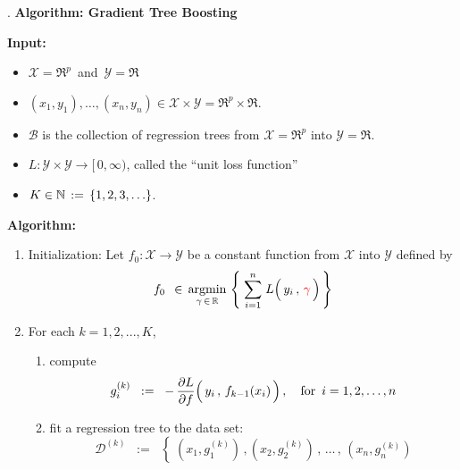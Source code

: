 \begin{center}
\begin{minipage}{6in}
\begin{tcolorbox}[width=0.95\linewidth,colback=white,colframe=gray]
	\begin{center}
	{\color{white}.}\vskip 0.1cm
	\textbf{\large Algorithm: Gradient Tree Boosting}
	\end{center}
	\textbf{Input:}
	\begin{itemize}
	\item
		$\mathcal{X} = \Re^{p}$\, and \,$\mathcal{Y} = \Re$
	\item
		$(x_{1},y_{1}), \ldots, (x_{n},y_{n}) \in \mathcal{X} \times \mathcal{Y} = \Re^{p} \times \Re$.
	\item
		$\mathcal{B}$ is the collection of regression trees from $\mathcal{X} = \Re^{p}$ into $\mathcal{Y} = \Re$.
	\item
		$L : \mathcal{Y} \times \mathcal{Y} \longrightarrow [\,0,\infty)$, called the ``unit loss function''
	\item
		$K \in \mathbb{N} \,:=\, \{1,2,3,\ldots\}$.
	\end{itemize}
	\vskip 0.3cm
	\textbf{Algorithm:}
	\begin{enumerate}
	\item
		Initialization:
		Let $f_{0} : \mathcal{X} \longrightarrow \mathcal{Y}$ be a constant function from $\mathcal{X}$ into $\mathcal{Y}$
		defined by
		\begin{equation*}
		f_{0}
		\;\,\in\,
			\underset{\gamma \,\in\, \Re}{\argmin}\,
			\left\{\;
				\overset{n}{\underset{i=1}{\sum}}\;
				L\!\left(\,y_{i}\,,\,\overset{{\color{white}1}}{{\color{red}\gamma}}\,\right)
				\,\right\}
		\end{equation*}
	\item
		For each $k = 1, 2, ... , K$, 
		\begin{enumerate}
		\item
			compute
			\begin{equation*}
			g^{(k)}_{i}
			\;\; := \;\;
				-\,\dfrac{\partial L}{\partial f}\!\left(\,y_{i}\,,\,\overset{{{\color{white}.}}}{f_{k-1}(x_{i})}\,\right),
			\quad
			\textnormal{for \,$i = 1,2,\ldots,n$}
			\end{equation*}
		\item
			fit a regression tree to the data set:
			\begin{equation*}
			\mathscr{D}^{(k)}
			\;\; := \;\;
				\left\{\;
					(x_{1},g^{(k)}_{1})\,,
					(x_{2},g^{(k)}_{2})\,,
					\,\ldots\,,\,
					(x_{n},g^{(k)}_{n})

\end{equation*}
\end{enumerate}
\end{enumerate}
\end{tcolorbox}
\end{minipage}
\end{center}
